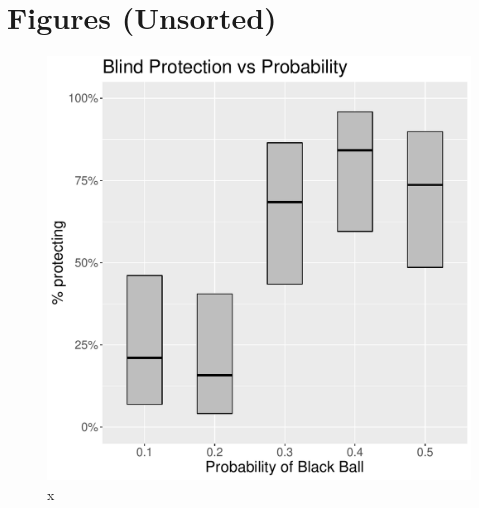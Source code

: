 \documentclass[11pt,a4paper]{article}
\begin{document}
%

%

%

%


%
\vspace{40pt}
\newpage

\newpage

\section{Figures (Unsorted)}

\begin{figure}[!h]
\centering
\caption{x} \label{Blind Protection Responses}

  \centering
  \includegraphics[scale=0.3]{Graphs/BLProt_plot2.pdf}

\end{figure}
\end{document}
